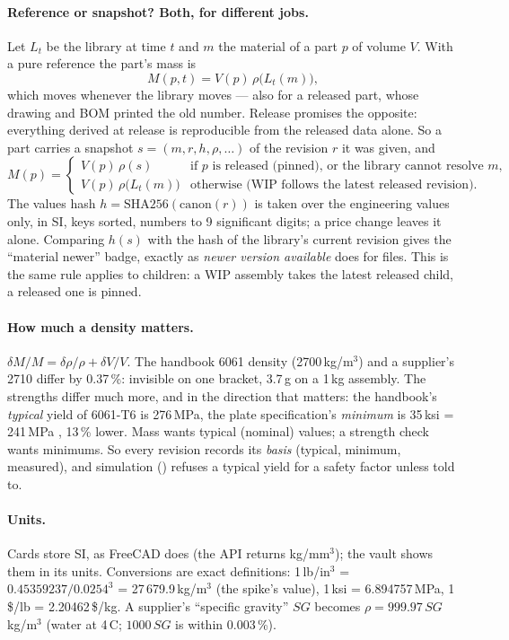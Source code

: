 \paragraph{Reference or snapshot? Both, for different jobs.} Let $L_t$ be the library at time $t$ and $m$ the material
of a part $p$ of volume $V$. With a pure reference the part's mass is
\[
  M(p,t) = V(p)\,\rho\bigl(L_t(m)\bigr),
\]
which moves whenever the library moves --- also for a released part, whose drawing and BOM printed the old number. Release
promises the opposite: everything derived at release is reproducible from the released data alone. So a part carries a
snapshot $s = (m, r, h, \rho, \ldots)$ of the revision $r$ it was given, and
\[
  M(p) =
  \begin{cases}
    V(p)\,\rho(s) & \text{if } p \text{ is released (pinned), or the library cannot resolve } m,\\
    V(p)\,\rho\bigl(L_t(m)\bigr) & \text{otherwise (WIP follows the latest released revision).}
  \end{cases}
\]
The values hash $h = \mathrm{SHA256}(\mathrm{canon}(r))$ is taken over the engineering values only, in SI, keys sorted,
numbers to 9 significant digits; a price change leaves it alone. Comparing $h(s)$ with the hash of the library's current
revision gives the ``material newer'' badge, exactly as \emph{newer version available} does for files. This is the same
rule  applies to children: a WIP assembly takes the latest released child, a released one is pinned.

\paragraph{How much a density matters.} $\delta M / M = \delta\rho/\rho + \delta V/V$. The handbook 6061 density
(2700\,kg/m$^3$) and a supplier's 2710 differ by 0.37\,\%: invisible on one bracket, 3.7\,g on a 1\,kg assembly. The
strengths differ much more, and in the direction that matters: the handbook's \emph{typical} yield of 6061-T6 is 276\,MPa,
the plate specification's \emph{minimum} is 35\,ksi = 241\,MPa \verify, 13\,\% lower. Mass wants typical (nominal)
values; a strength check wants minimums. So every revision records its \emph{basis} (typical, minimum, measured), and
simulation () refuses a typical yield for a safety factor unless told to.

\paragraph{Units.} Cards store SI, as FreeCAD does (the API returns kg/mm$^3$); the vault shows them in its units.
Conversions are exact definitions: 1\,lb/in$^3$ = $0.45359237 / 0.0254^3$ = 27\,679.9\,kg/m$^3$ (the spike's value), 1\,ksi =
6.894757\,MPa, 1\,\$/lb = 2.20462\,\$/kg. A supplier's ``specific gravity'' $SG$ becomes $\rho = 999.97\,SG$\,kg/m$^3$
(water at 4\,\textdegree C; $1000\,SG$ is within 0.003\,\%).

